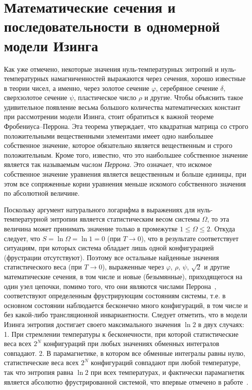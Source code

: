 \chapter{Математические сечения и последовательности в одномерной модели Изинга}\label{ch:ch5}

Как уже отмечено, некоторые значения нуль-температурных энтропий и нуль-температурных намагниченностей выражаются через сечения, хорошо известные в теории чисел, а именно, через золотое сечение $\varphi$, серебряное сечение $\delta$, сверхзолотое сечение $\psi$, пластическое число $\rho$ и другие. Чтобы объяснить такое удивительное появление весьма большого количества математических констант при рассмотрении модели Изинга, стоит обратиться к важной теореме Фробениуса--Перрона. Эта теорема утверждает, что квадратная матрица со строго положительными вещественными элементами имеет одно наибольшее собственное значение, которое обязательно является вещественным и строго положительным. Кроме того, известно, что это наибольшее собственное значение является так называемым \emph{числом Перрона}. Это означает, что искомое собственное значение уравнения является вещественным и больше единицы, при этом все сопряженные корни уравнения меньше искомого собственного значения по абсолютной величине. 

Поскольку аргумент натурального логарифма в выражениях для нуль-температурной энтропии является статистическим весом системы $\Omega$, то эта величина может принимать значение только в промежутке $1\leqslant \Omega\leqslant 2$. Откуда следует, что $S= \ln \Omega =  \ln 1 = 0$ (при $T \rightarrow 0$), что в результате соответствует ситуациям, при которых система обладает лишь одной конфигурацией (фрустрации отсутствуют). Поэтому все остальные найденные значения статистического веса (при $T \rightarrow 0$), выраженные через $\varphi$, $\rho$, $\psi$,  $\sqrt{2}$ и другие математические сечения, в том числе и новые (безымянные), приходящегося на один узел цепочки, помимо того, что они являются числами Перрона~\cite{wu2010, lind1992, boyd1985}, соответствуют определенным фрустрирующим состояниям системы, т.е. в основном состоянии наблюдается бесконечно много конфигураций, в том числе и без какой-либо трансляционной инвариантности. Следует отметить, что в модели Изинга энтропия достигает своего максимального значения $\ln 2$ в двух случаях: 1. При стремлении температуры к бесконечности, при которой статистические веса всех $2^N$ конфигураций при любых значениях обменных интегралов совпадают. 2. В парамагнетике, в котором все обменные интегралы равны нулю, статистические веса всех $2^N$ конфигураций совпадают при любой температуре, так что энтропия равна $\ln 2$ при всех температурах, и фактически парамагнетик является абсолютно фрустрированной системой, что впервые отмечено в работе~\cite{zarubin2019}. 

